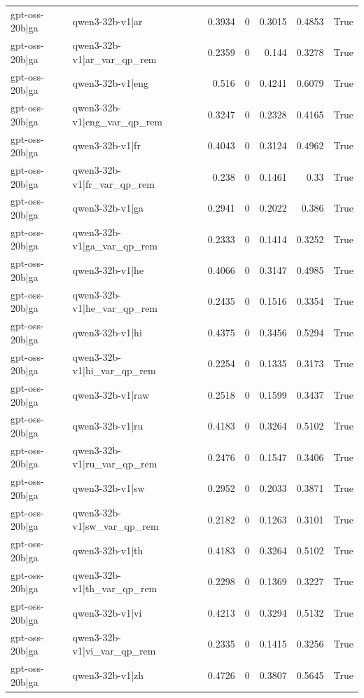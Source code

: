 \begin{table}
\begin{tabular}{l l r r r r l}
gpt-oss-20b|ga & qwen3-32b-v1|ar & 0.3934 & 0 & 0.3015 & 0.4853 & True \\
gpt-oss-20b|ga & qwen3-32b-v1|ar_var_qp_rem & 0.2359 & 0 & 0.144 & 0.3278 & True \\
gpt-oss-20b|ga & qwen3-32b-v1|eng & 0.516 & 0 & 0.4241 & 0.6079 & True \\
gpt-oss-20b|ga & qwen3-32b-v1|eng_var_qp_rem & 0.3247 & 0 & 0.2328 & 0.4165 & True \\
gpt-oss-20b|ga & qwen3-32b-v1|fr & 0.4043 & 0 & 0.3124 & 0.4962 & True \\
gpt-oss-20b|ga & qwen3-32b-v1|fr_var_qp_rem & 0.238 & 0 & 0.1461 & 0.33 & True \\
gpt-oss-20b|ga & qwen3-32b-v1|ga & 0.2941 & 0 & 0.2022 & 0.386 & True \\
gpt-oss-20b|ga & qwen3-32b-v1|ga_var_qp_rem & 0.2333 & 0 & 0.1414 & 0.3252 & True \\
gpt-oss-20b|ga & qwen3-32b-v1|he & 0.4066 & 0 & 0.3147 & 0.4985 & True \\
gpt-oss-20b|ga & qwen3-32b-v1|he_var_qp_rem & 0.2435 & 0 & 0.1516 & 0.3354 & True \\
gpt-oss-20b|ga & qwen3-32b-v1|hi & 0.4375 & 0 & 0.3456 & 0.5294 & True \\
gpt-oss-20b|ga & qwen3-32b-v1|hi_var_qp_rem & 0.2254 & 0 & 0.1335 & 0.3173 & True \\
gpt-oss-20b|ga & qwen3-32b-v1|raw & 0.2518 & 0 & 0.1599 & 0.3437 & True \\
gpt-oss-20b|ga & qwen3-32b-v1|ru & 0.4183 & 0 & 0.3264 & 0.5102 & True \\
gpt-oss-20b|ga & qwen3-32b-v1|ru_var_qp_rem & 0.2476 & 0 & 0.1547 & 0.3406 & True \\
gpt-oss-20b|ga & qwen3-32b-v1|sw & 0.2952 & 0 & 0.2033 & 0.3871 & True \\
gpt-oss-20b|ga & qwen3-32b-v1|sw_var_qp_rem & 0.2182 & 0 & 0.1263 & 0.3101 & True \\
gpt-oss-20b|ga & qwen3-32b-v1|th & 0.4183 & 0 & 0.3264 & 0.5102 & True \\
gpt-oss-20b|ga & qwen3-32b-v1|th_var_qp_rem & 0.2298 & 0 & 0.1369 & 0.3227 & True \\
gpt-oss-20b|ga & qwen3-32b-v1|vi & 0.4213 & 0 & 0.3294 & 0.5132 & True \\
gpt-oss-20b|ga & qwen3-32b-v1|vi_var_qp_rem & 0.2335 & 0 & 0.1415 & 0.3256 & True \\
gpt-oss-20b|ga & qwen3-32b-v1|zh & 0.4726 & 0 & 0.3807 & 0.5645 & True \\

\end{tabular}
\end{table}

